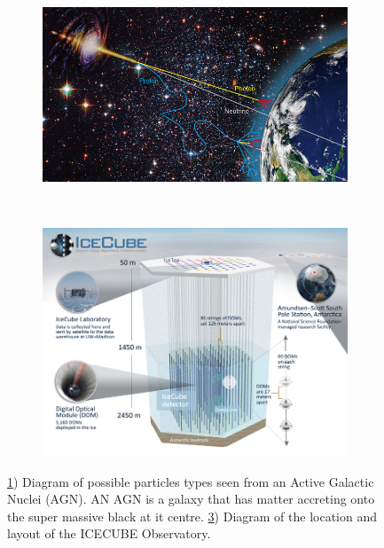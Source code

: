 \documentclass[a4paper,12pt,twoside]{article}
\begin{document}
\begin{figure}[h]
\centering
\begin{subfigure}[b]{0.4\textwidth}
\includegraphics[width=\textwidth]{particlesFromAGN.jpg}
\caption{}
\label{fig:AGNpart}
\end{subfigure}
~
\begin{subfigure}[b]{0.45\textwidth}
\includegraphics[width=\textwidth]{icecube_detector_sm.png}
\caption{}
\label{fig:ICECUBE}
\end{subfigure}
\caption{\ref{fig:AGNpart}) Diagram of possible particles types seen from an Active Galactic Nuclei (AGN). AN AGN is a galaxy that has matter accreting onto the super massive black at it centre. \ref{fig:ICECUBE}) Diagram of the location and layout of the ICECUBE Observatory.}
\end{figure}
\end{document}
